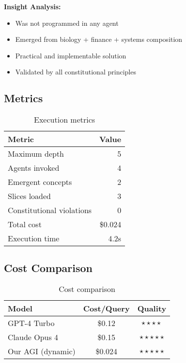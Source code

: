 \documentclass[11pt]{article}
\begin{document}
\textbf{Insight Analysis:}

\begin{itemize}
    \item Was not programmed in any agent
    \item Emerged from biology + finance + systems composition
    \item Practical and implementable solution
    \item Validated by all constitutional principles
\end{itemize}

\subsection{Metrics}

\begin{table}[H]
\centering
\begin{tabular}{@{}lr@{}}
\toprule
\textbf{Metric} & \textbf{Value} \\ \midrule
Maximum depth & 5 \\
Agents invoked & 4 \\
Emergent concepts & 2 \\
Slices loaded & 3 \\
Constitutional violations & 0 \\
Total cost & \$0.024 \\
Execution time & 4.2s \\ \bottomrule
\end{tabular}
\caption{Execution metrics}
\end{table}

\subsection{Cost Comparison}

\begin{table}[H]
\centering
\begin{tabular}{@{}lcc@{}}
\toprule
\textbf{Model} & \textbf{Cost/Query} & \textbf{Quality} \\ \midrule
GPT-4 Turbo & \$0.12 & $\star\star\star\star$ \\
Claude Opus 4 & \$0.15 & $\star\star\star\star\star$ \\
Our AGI (dynamic) & \$0.024 & $\star\star\star\star\star$ \\ \bottomrule
\end{tabular}
\caption{Cost comparison}
\end{table}
\end{document}

